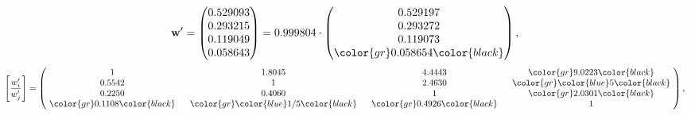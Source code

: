 \begin{example}
\begin{equation*}
\mathbf{w}^{\prime} =
\begin{pmatrix}
0.529093\\
0.293215\\
0.119049\\
0.058643
\end{pmatrix} =
0.999804\cdot
\begin{pmatrix}
0.529197\\
0.293272\\
0.119073\\
\color{gr} 0.058654\color{black}
\end{pmatrix},
\end{equation*}
\begin{equation*}
\left[ \frac{{w}^{\prime}_i}{{w}^{\prime}_j} \right] =
\begin{pmatrix}
$\,\,$ 1 $\,\,$ & $\,\,$1.8045$\,\,$ & $\,\,$4.4443$\,\,$ & $\,\,$\color{gr} 9.0223\color{black} $\,\,$ \\
$\,\,$0.5542$\,\,$ & $\,\,$ 1 $\,\,$ & $\,\,$2.4630$\,\,$ & $\,\,$\color{gr} \color{blue} 5\color{black}   $\,\,$ \\
$\,\,$0.2250$\,\,$ & $\,\,$0.4060$\,\,$ & $\,\,$ 1 $\,\,$ & $\,\,$\color{gr} 2.0301\color{black}  $\,\,$ \\
$\,\,$\color{gr} 0.1108\color{black} $\,\,$ & $\,\,$\color{gr} \color{blue}  1/5\color{black} $\,\,$ & $\,\,$\color{gr} 0.4926\color{black} $\,\,$ & $\,\,$ 1  $\,\,$ \\
\end{pmatrix},
\end{equation*}
\end{example}
\newpage
